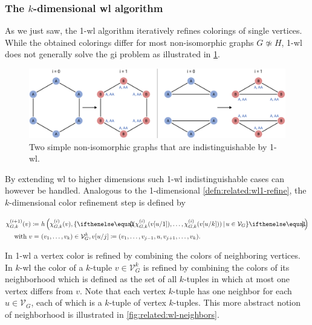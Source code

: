 \subsubsection{The $k$-dimensional \acs{wl} algorithm}
As we just saw, the 1-\acs{wl} algorithm iteratively refines colorings of single vertices.
While the obtained colorings differ for most non-isomorphic graphs $G \not\simeq H$, 1-\acs{wl} does not generally solve the \ac{gi} problem as illustrated in \cref{fig:related:wl1-problem}.
\begin{figure}[ht]
	\centering
	\includegraphics[width=\linewidth]{gfx/related-work/wl1-problem.pdf}
	\caption[Two simple non-isomorphic graphs that are indistinguishable by 1-\acs{wl}.]{
		Two simple non-isomorphic graphs that are indistinguishable by 1-\acs{wl}.
	}\label{fig:related:wl1-problem}
\end{figure}
By extending \ac{wl} to higher dimensions such 1-\acs{wl} indistinguishable cases can however be handled.
Analogous to the 1-dimensional \cref{defn:related:wl1-refine}, the $k$-dimensional color refinement step is defined by
\begin{defn}\label{defn:related:wlk-refine}
	$\begin{aligned}[t]
		\chi_{G,k}^{(i+1)}(v) \coloneqq &\ h\left(\chi_{G,k}^{(i)}(v), \ldblbrace (\chi_{G,k}^{(i)}(v[u/1]), \dots, \chi_{G,k}^{(i)}(v[u/k]))\, |\, u \in \mathcal{V}_G \rdblbrace\right)\\
		\text{with } v = &\ (v_1, \dots, v_k) \in \mathcal{V}_G^k, v[u/j] \coloneqq (v_1, \dots, v_{j-1}, u, v_{j+1}, \dots, v_k) \text{.}
	\end{aligned}$
\end{defn}
In 1-\acs{wl} a vertex color is refined by combining the colors of neighboring vertices.
In $k$-\acs{wl} the color of a $k$-tuple $v \in \mathcal{V}_G^k$ is refined by combining the colors of its neighborhood which is defined as the set of all $k$-tuples in which at most one vertex differs from $v$.
Note that each vertex $k$-tuple has one neighbor for each $u \in \mathcal{V}_G$, each of which is a $k$-tuple of vertex $k$-tuples.
This more abstract notion of neighborhood is illustrated in \cref{fig:related:wl-neighbors}.
